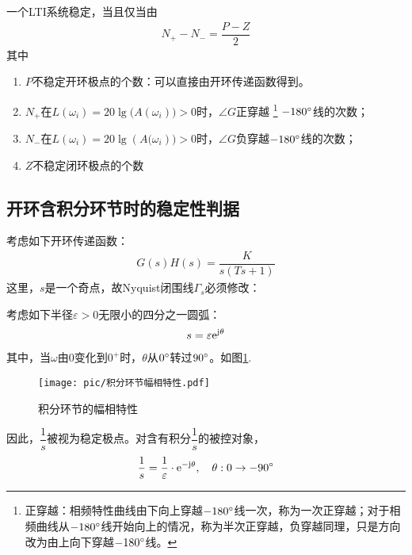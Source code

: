 \theorem[对数频率稳定判据]
一个LTI系统稳定，当且仅当由
\begin{align}
	N_+  - N_- = \dfrac{P - Z}{2}
\end{align}
其中
\vspace*{-0.5em}
\begin{enumerate}[\hspace*{2em}]
	\item $P$\quad 不稳定开环极点的个数：可以直接由开环传递函数得到。\vspace*{-0.5em}
	
	\item $N_+$\quad 在$L(\omega_i) = 20\lg\big(A(\omega_i)\big) > 0$时，$\angle G$正穿越
	\footnote{正穿越：相频特性曲线由下向上穿越$-180{}^{\circ}$线一次，称为一次正穿越；对于相频曲线从$-180{}^{\circ}$线开始向上的情况，称为半次正穿越，负穿越同理，只是方向改为由上向下穿越$-180{}^{\circ}$线。}
	$-180{}^{\circ}$线的次数；\vspace*{-0.5em}
	
	\item $N_-$\quad 在$L(\omega_i) = 20\lg(A\big(\omega_i)\big) > 0$时，$\angle G$负穿越$-180{}^{\circ}$线的次数；\vspace*{-0.5em}
	
	\item $Z$\quad 不稳定闭环极点的个数
	
\end{enumerate}

\subsection{开环含积分环节时的稳定性判据}
考虑如下开环传递函数：
\begin{align}
	G(s)H(s) = \dfrac{K}{s(Ts + 1)}
\end{align}
这里，$s$是一个奇点，故Nyquist闭围线$\varGamma_s$必须修改：

考虑如下半径$\varepsilon > 0$无限小的四分之一圆弧：
\begin{align}
	s = \varepsilon {\rm{e}}^{\text{j} \theta}
\end{align}
其中，当$\omega$由0变化到$0^+$时，$\theta$从$0{}^{\circ}$转过$90{}^{\circ}$。如图\ref{积分环节的幅相特性}.
\begin{figure}[!htb]
	\centering
	\texttt{[image: pic/积分环节幅相特性.pdf]}
	\caption{积分环节的幅相特性}
	\label{积分环节的幅相特性}
\end{figure}

因此，$\dfrac{1}{s}$被视为稳定极点。对含有积分$\dfrac{1}{s}$的被控对象，
\begin{align}
	\dfrac{1}{s} = \dfrac{1}{\varepsilon} \cdot {\rm{e}}^{- \text{j} \theta}, \quad \theta : 0 \to -90{}^{\circ}
\end{align}

